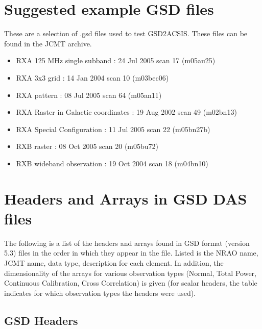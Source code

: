 \documentclass[twoside,11pt]{article}
\newcommand{\htmladdnormallink}[2]{#1}
\newcommand{\xlabel}[1]{}
\renewcommand{\_}{\texttt{\symbol{95}}}
\begin{document}
\section{\xlabel{GSDexamples}Suggested example GSD files}

These are a selection of .gsd files used to test GSD2ACSIS.  These files can be found in the \htmladdnormallink{JCMT archive}{http://www.cadc.hia.nrc.gc.ca/jcmt/search/scan}.

\begin{itemize}
\item RXA 125 MHz single subband : 24 Jul 2005 scan 17 (m05au25)
\item RXA 3x3 grid : 14 Jan 2004 scan 10 (m03bec06)
\item RXA pattern : 08 Jul 2005 scan 64 (m05an11)
\item RXA Raster in Galactic coordinates : 19 Aug 2002 scan 49 (m02bn13)
\item RXA Special Configuration : 11 Jul 2005 scan 22 (m05bn27b)
\item RXB raster : 08 Oct 2005 scan 20 (m05bu72)
\item RXB wideband observation : 19 Oct 2004 scan 18 (m04bn10)
\end{itemize}

\appendix

\section{\xlabel{GSDvariables}Headers and Arrays in GSD DAS files}

The following is a list of the headers and arrays found in GSD format (version 5.3) files in the order in which they appear in the file.  Listed is the NRAO name, JCMT name, data type, description for each element.  In addition, the dimensionality of the arrays for various observation types (Normal, Total Power, Continuous Calibration, Cross Correlation) is given (for scalar headers, the table indicates for which observation types the headers were used).


\newpage
\subsection{\xlabel{GSDheaders}GSD Headers}
\end{document}
